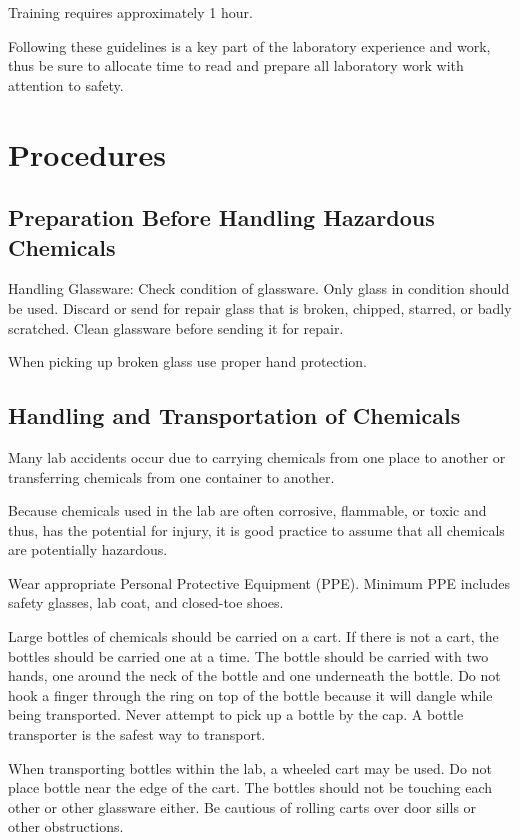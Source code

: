 \documentclass[12pt]{../SOP3_beta}\usepackage[]{graphicx}\usepackage[]{color}
\begin{document}
\NP Training requires approximately 1 hour.

\NP Following these guidelines is a key part of the laboratory experience and work, thus be sure to allocate time to read and prepare all laboratory work with attention to safety.

\section{Procedures}

\subsection*{Preparation Before Handling Hazardous Chemicals}

\NP Handling Glassware: Check condition of glassware. Only glass in condition should be used. Discard or send for repair glass that is broken, chipped, starred, or badly scratched. Clean glassware before sending it for repair. 

\NP When picking up broken glass use proper hand protection.

\subsection*{Handling and Transportation of Chemicals}

\NP Many lab accidents occur due to carrying chemicals from one place to another or transferring chemicals from one container to another. 

\NP Because chemicals used in the lab are often corrosive, flammable, or toxic and thus, has the potential for injury, it is good practice to assume that all chemicals are potentially hazardous. 

\NP Wear appropriate Personal Protective Equipment (PPE). Minimum PPE includes safety glasses, lab coat, and closed-toe shoes.

\NP Large bottles of chemicals should be carried on a cart. If there is not a cart, the bottles should be carried one at a time. The bottle should be carried with two hands, one around the neck of the bottle and one underneath the bottle. Do not hook a finger through the ring on top of the bottle because it will dangle while being transported. Never attempt to pick up a bottle by the cap. A bottle transporter is the safest way to transport. 

\NP When transporting bottles within the lab, a wheeled cart may be used. Do not place bottle near the edge of the cart. The bottles should not be touching each other or other glassware either. Be cautious of rolling carts over door sills or other obstructions.
\end{document}
